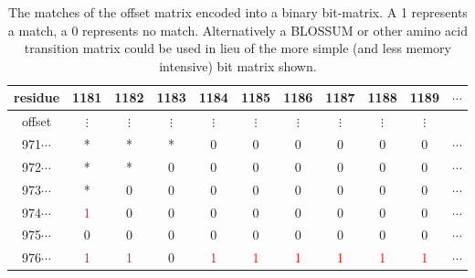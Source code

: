 \documentclass[phd,tocprelim]{cornell}
\begin{document}
\begin{table}[htp]
    \caption[Velvetrope offset bit-matrix]{The matches of the offset matrix encoded into a binary bit-matrix. A 1 represents a match, a 0 represents no match. Alternatively a BLOSSUM or other amino acid transition matrix could be used in lieu of the more simple (and less memory intensive) bit matrix shown.}
    \label{VRtab2}
\begin{center}
{\small
\begin{tabular}{|ccccccccccc|}                                                                                                     
\hline                                                                                                                                      
\scriptsize{residue} & \small{1181} &  \small{1182} &  \small{1183} &  \small{1184} &  \small{1185} &  \small{1186} &  \small{1187} &  \small{1188} &  \small{1189} & \small{}$\cdots$ \\                                                                                             
\hline                                                                                                                                                                                                      
\scriptsize{offset} & $\vdots$ &  $\vdots$ &  $\vdots$ & $\vdots$ &  $\vdots$ &  $\vdots$ & $\vdots$ &  $\vdots$ &  $\vdots$ & \\                                                                                                                                                                          
\small{971}$\cdots$ & * & * & * & 0 & 0 & 0 & 0 & 0 & 0 & $\cdots$ \\                                                                                  
\small{972}$\cdots$ & * & * & 0 & 0 & 0 & 0 & 0 & 0 & 0 & $\cdots$ \\                                                                                  
\small{973}$\cdots$ & * & 0 & 0 & 0 & 0 & 0 & 0 & 0 & 0 & $\cdots$ \\                                                                                  
\small{974}$\cdots$ & \textcolor{red}{1} & 0 & 0 & 0 & 0 & 0 & 0 & 0 & 0 & $\cdots$ \\                                                                 
\small{975}$\cdots$ & 0 & 0 & 0 & 0 & 0 & 0 & 0 & 0 & 0 & $\cdots$ \\
\small{976}$\cdots$ & \textcolor{red}{1} & \textcolor{red}{1} & 0 & \textcolor{red}{1} & \textcolor{red}{1} & \textcolor{red}{1} & \textcolor{red}{1} & \textcolor{red}{1} & \textcolor{red}{1} &  $\cdots$ \\

\end{tabular}}
\end{center}
\end{table}
\end{document}
